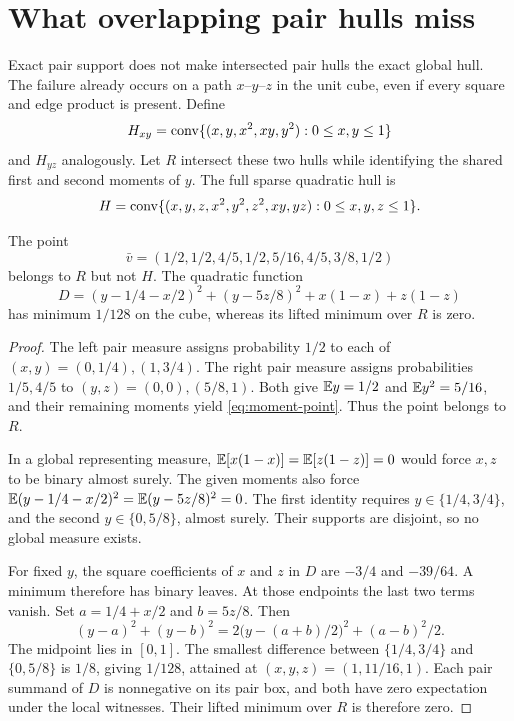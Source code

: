 \section{What overlapping pair hulls miss}\label{sec:overlap}

Exact pair support does not make intersected pair hulls the exact global
hull. The failure already occurs on a path $x$--$y$--$z$ in the unit
cube, even if every square and edge product is present. Define
\[
H_{xy}=\operatorname{conv}\{(x,y,x^2,xy,y^2):0\le x,y\le1\}
\]
and $H_{yz}$ analogously. Let $R$ intersect these two hulls while
identifying the shared first and second moments of $y$. The full sparse
quadratic hull is
\[
H=\operatorname{conv}\{(x,y,z,x^2,y^2,z^2,xy,yz):0\le x,y,z\le1\}.
\]

\begin{proposition}\label{prop:overlap}
The point
\begin{equation}\label{eq:moment-point}
\bar v=(1/2,1/2,4/5,1/2,5/16,4/5,3/8,1/2)
\end{equation}
belongs to $R$ but not $H$. The quadratic function
\begin{equation}\label{eq:D}
D=(y-1/4-x/2)^2+(y-5z/8)^2+x(1-x)+z(1-z)
\end{equation}
has minimum $1/128$ on the cube, whereas its lifted minimum over $R$
is zero.
\end{proposition}
\begin{proof}
The left pair measure assigns probability $1/2$ to each of
$(x,y)=(0,1/4),(1,3/4)$. The right pair measure assigns probabilities
$1/5,4/5$ to $(y,z)=(0,0),(5/8,1)$. Both give
$\mathbb E y=1/2$ and $\mathbb E y^2=5/16$, and their remaining moments yield
\eqref{eq:moment-point}. Thus the point belongs to $R$.

In a global representing measure, $\mathbb E[x(1-x)]=\mathbb E[z(1-z)]=0$
would force $x,z$ to be binary almost surely. The given moments also
force $\mathbb E(y-1/4-x/2)^2=\mathbb E(y-5z/8)^2=0$. The first identity requires
$y\in\{1/4,3/4\}$, and the second $y\in\{0,5/8\}$, almost surely.
Their supports are disjoint, so no global measure exists.

For fixed $y$, the square coefficients of $x$ and $z$ in $D$ are
$-3/4$ and $-39/64$. A minimum therefore has binary leaves. At those
endpoints the last two terms vanish. Set $a=1/4+x/2$ and $b=5z/8$.
Then
\[
(y-a)^2+(y-b)^2
=2\bigl(y-(a+b)/2\bigr)^2+(a-b)^2/2.
\]
The midpoint lies in $[0,1]$. The smallest difference between
$\{1/4,3/4\}$ and $\{0,5/8\}$ is $1/8$, giving $1/128$,
attained at $(x,y,z)=(1,11/16,1)$. Each pair summand of $D$ is
nonnegative on its pair box, and both have zero expectation under the
local witnesses. Their lifted minimum over $R$ is therefore zero.
\end{proof}

